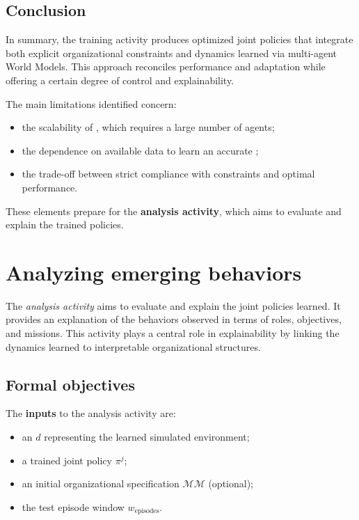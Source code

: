 \section{Conclusion}

In summary, the training activity produces optimized joint policies that integrate both explicit organizational constraints and dynamics learned via multi-agent World Models.
This approach reconciles performance and adaptation while offering a certain degree of control and explainability.

The main limitations identified concern:
\begin{itemize}
  \item the scalability of , which requires a large number of agents;
  \item the dependence on available data to learn an accurate ;
  \item the trade-off between strict compliance with constraints and optimal performance.
\end{itemize}

These elements prepare for the \textbf{analysis activity}, which aims to evaluate and explain the trained policies.


\clearpage
\thispagestyle{empty}
\null
\newpage

\chapter{Analyzing emerging behaviors}
\label{chap:analyzing}

The \textit{analysis activity} aims to evaluate and explain the joint policies learned. It provides an explanation of the behaviors observed in terms of roles, objectives, and missions. This activity plays a central role in explainability by linking the dynamics learned to interpretable organizational structures.


\section*{Formal objectives}


The \textbf{inputs} to the analysis activity are:
\begin{itemize}
  \item an  $d$ representing the learned simulated environment;
  \item a trained joint policy $\pi^j$;
  \item an initial organizational specification $\mathcal{MM}$ (optional);
  \item the test episode window $w_{\text{episodes}}$.
\end{itemize}

